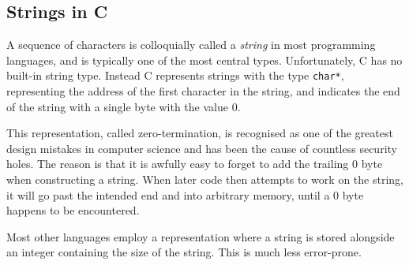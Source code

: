 \subsection{Strings in C}

A sequence of characters is colloquially called a \emph{string} in
most programming languages, and is typically one of the most central
types.  Unfortunately, C has no built-in string type.  Instead C
represents strings with the type \texttt{char*}, representing the
address of the first character in the string, and indicates the end of
the string with a single byte with the value $0$.

This representation, called zero-termination, is recognised as one of
the greatest design mistakes in computer science and has been the
cause of countless security holes.  The reason is that it is awfully
easy to forget to add the trailing $0$ byte when constructing a
string.  When later code then attempts to work on the string, it will
go past the intended end and into arbitrary memory, until a $0$ byte
happens to be encountered.

Most other languages employ a representation where a string is stored
alongside an integer containing the size of the string.  This is much
less error-prone.

